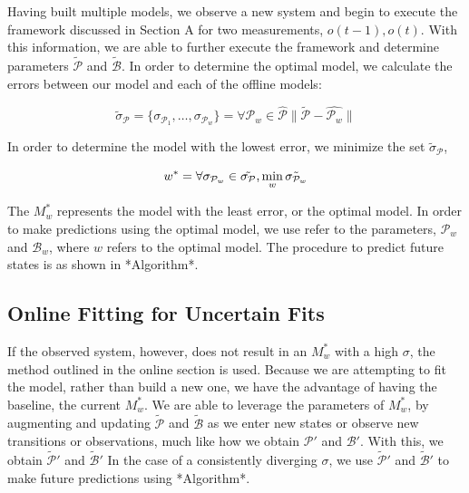 \documentclass[conference]{IEEEtran}
\begin{document}
Having built multiple models, we observe a new system and begin to execute the framework discussed in Section A for two measurements, $o(t-1),o(t)$. With this information, we are able to further execute the framework and determine parameters $\tilde{\mathcal{P}}$ and $\tilde{\mathcal{B}}$. In order to determine the optimal model, we calculate the errors between our model and each of the offline models:

\begin{equation} \label{probdist}
    \tilde{\sigma}_\mathcal{P} = \{\sigma_{\mathcal{P}_{1}},\ldots,\sigma_{\mathcal{P}_{w}}\} = \forall\mathcal{P}_w\in\hat{\mathcal{P}} \lVert \tilde{\mathcal{P}}-\hat{\mathcal{P}_w} \rVert
\end{equation}


In order to determine the model with the lowest error, we minimize the set $\tilde{\sigma}_\mathcal{P}$,

\begin{equation}
    w^* = \forall\sigma_{\mathcal{P}_w}\in\tilde{\sigma_\mathcal{P}}\text,  \min_{w} \tilde{\sigma_{\mathcal{P}_w}}
\end{equation}

The $M^*_{w}$ represents the model with the least error, or the optimal model. In order to make predictions using the optimal model, we use refer to the parameters, $\mathcal{P}_w$ and $\mathcal{B}_w$, where $w$ refers to the optimal model. The procedure to predict future states is as shown in *Algorithm*.



\subsection{Online Fitting for Uncertain Fits}
If the observed system, however, does not result in an $M^*_{w}$ with a high $\sigma$, the method outlined in the online section is used. Because we are attempting to fit the model, rather than build a new one, we have the advantage of having the baseline, the current $M^*_{w}$. We are able to leverage the parameters of $M^*_{w}$, by augmenting and updating $\tilde{\mathcal{P}}$ and $\tilde{\mathcal{B}}$ as we enter new states or observe new transitions or observations, much like how we obtain $\mathcal{P}'$ and $\mathcal{B}'$. With this, we obtain $\tilde{\mathcal{P}}'$ and $\tilde{\mathcal{B}}'$ In the case of a consistently diverging $\sigma$, we use $\tilde{\mathcal{P}}'$ and $\tilde{\mathcal{B}}'$ to make future predictions using *Algorithm*.
\end{document}
